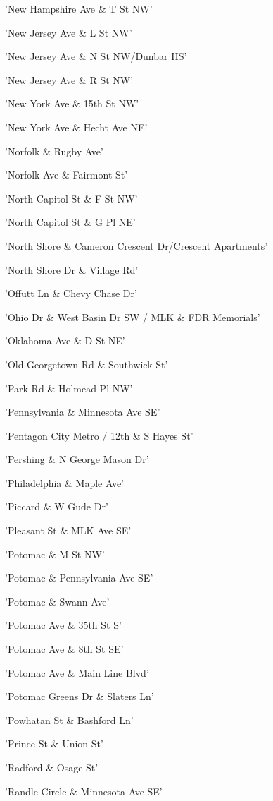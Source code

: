 \documentclass[11pt]{article}
\begin{document}
\begin{enumerate*}
\item 'New Hampshire Ave \& T St NW'
\item 'New Jersey Ave \& L St NW'
\item 'New Jersey Ave \& N St NW/Dunbar HS'
\item 'New Jersey Ave \& R St NW'
\item 'New York Ave \& 15th St NW'
\item 'New York Ave \& Hecht Ave NE'
\item 'Norfolk \& Rugby Ave'
\item 'Norfolk Ave \& Fairmont St'
\item 'North Capitol St \& F St NW'
\item 'North Capitol St \& G Pl NE'
\item 'North Shore \& Cameron Crescent Dr/Crescent Apartments'
\item 'North Shore Dr \& Village Rd'
\item 'Offutt Ln \& Chevy Chase Dr'
\item 'Ohio Dr \& West Basin Dr SW / MLK \& FDR Memorials'
\item 'Oklahoma Ave \& D St NE'
\item 'Old Georgetown Rd \& Southwick St'
\item 'Park Rd \& Holmead Pl NW'
\item 'Pennsylvania \& Minnesota Ave SE'
\item 'Pentagon City Metro / 12th \& S Hayes St'
\item 'Pershing \& N George Mason Dr'
\item 'Philadelphia \& Maple Ave'
\item 'Piccard \& W Gude Dr'
\item 'Pleasant St \& MLK Ave SE'
\item 'Potomac \& M St NW'
\item 'Potomac \& Pennsylvania Ave SE'
\item 'Potomac \& Swann Ave'
\item 'Potomac Ave \& 35th St S'
\item 'Potomac Ave \& 8th St SE'
\item 'Potomac Ave \& Main Line Blvd'
\item 'Potomac Greens Dr \& Slaters Ln'
\item 'Powhatan St \& Bashford Ln'
\item 'Prince St \& Union St'
\item 'Radford \& Osage St'
\item 'Randle Circle \& Minnesota Ave SE'

\end{enumerate*}
\end{document}
